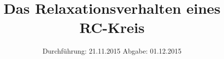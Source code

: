 

\subject{VERSUCH NUMMER 353}
\title{Das Relaxationsverhalten eines RC-Kreis}
\date{
  Durchführung: 21.11.2015
  \hspace{3em}
  Abgabe: 01.12.2015}



\maketitle
\thispagestyle{empty}
\tableofcontents
\newpage







\printbibliography


